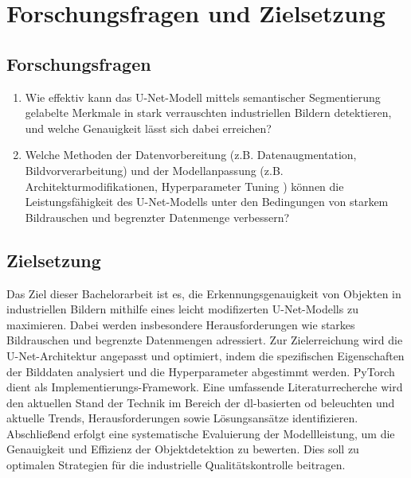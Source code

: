 \chapter{Forschungsfragen und Zielsetzung}\label{sec:exp_ziel}

\section{Forschungsfragen}

\begin{enumerate}

\item Wie effektiv kann das U-Net-Modell mittels semantischer Segmentierung gelabelte Merkmale in stark verrauschten industriellen Bildern detektieren, und welche Genauigkeit lässt sich dabei erreichen?

\item Welche Methoden der Datenvorbereitung (z.B. Datenaugmentation, Bildvorverarbeitung) und der Modellanpassung (z.B. Architekturmodifikationen, Hyperparameter Tuning ) können die Leistungsfähigkeit des U-Net-Modells unter den Bedingungen von starkem Bildrauschen und begrenzter Datenmenge verbessern?

\end{enumerate}

\section{Zielsetzung}

Das Ziel dieser Bachelorarbeit ist es, die Erkennungsgenauigkeit von Objekten in industriellen Bildern mithilfe eines leicht modifizerten U-Net-Modells zu maximieren. Dabei werden insbesondere Herausforderungen wie starkes Bildrauschen und begrenzte Datenmengen adressiert.
Zur Zielerreichung wird die U-Net-Architektur angepasst und optimiert, indem die spezifischen Eigenschaften der Bilddaten analysiert und die Hyperparameter abgestimmt werden. PyTorch dient als Implementierungs-Framework. Eine umfassende Literaturrecherche wird den aktuellen Stand der Technik im Bereich der \gls{dl}-basierten \gls{od} beleuchten und aktuelle Trends, Herausforderungen sowie Lösungsansätze identifizieren. Abschließend erfolgt eine systematische Evaluierung der Modellleistung, um die Genauigkeit und Effizienz der Objektdetektion zu bewerten. Dies soll zu optimalen Strategien für die industrielle Qualitätskontrolle beitragen.
